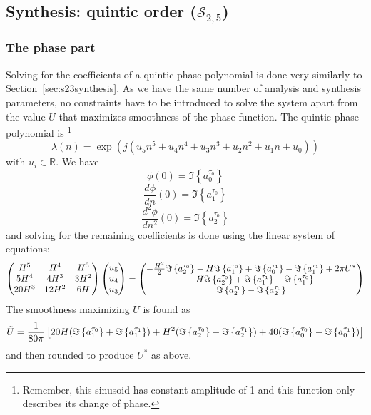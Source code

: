 \subsection{Synthesis: quintic order ($\mathscr{S}_{2,5}$) \label{s25synthesis}}

\subsubsection{The phase part}

Solving for the coefficients of a quintic phase polynomial is done very
similarly to Section~\ref{sec:s23synthesis}. As we have the same number of
analysis and synthesis parameters, no constraints have to be
introduced to solve the system apart from the value $U$ that maximizes
smoothness of the phase function. The quintic phase polynomial is%
\footnote{Remember, this sinusoid has constant amplitude of 1 and
this function only describes its change of phase.}
\begin{equation}
    \label{eq:quinticphasepoly}
    \lambda(n) = \exp \left(j\left(u_5 n^{5} + u_4 n^{4} + u_3 n^{3} + u_2 n^{2}
    + u_1 n + u_0 \right)\right)
\end{equation}
with $u_i \in \mathbb{R}$. We have
\[
    \phi(0) = \Im \left\{ a^{\tau_0}_0 \right\}
\]
\[
    \frac{d \phi}{d n}(0) = \Im \left\{ a^{\tau_0}_1 \right\}
\]
\[
    \frac{d^{2} \phi}{d n^{2}}(0) = \Im \left\{ a^{\tau_0}_2 \right\}
\]
and solving for the remaining coefficients is done using the linear system of
equations:
\[
    \begin{pmatrix}
        H^5 & H^4 & H^3 \\
        5 H^4 & 4 H^3 & 3 H^2 \\
        20 H^3 & 12 H^2 & 6 H
    \end{pmatrix}
    \begin{pmatrix}
        u_5 \\
        u_4 \\
        u_3
    \end{pmatrix}
    =
    \begin{pmatrix}
        -\frac{ H^{2} }{2} \Im \left\{  a^{\tau_0}_2  \right\} - H \Im \left\{  a^{\tau_0}_1  \right\} +
            \Im \left\{  a^{\tau_1}_0  \right\} - \Im \left\{  a^{\tau_1}_1  \right\} + 2 \pi U^{\ast}\\
        -H \Im \left\{  a^{\tau_0}_2  \right\} + \Im \left\{  a^{\tau_1}_1  \right\} - \Im \left\{  a^{\tau_0}_1  \right\} \\
        \Im \left\{  a^{\tau_1}_2  \right\} - \Im \left\{  a^{\tau_0}_2  \right\}
    \end{pmatrix}
\]
The smoothness maximizing $\tilde{U}$ is found as
\[
    \tilde{U} = \frac{1}{80 \pi} \left[ 20 H ( \Im \left\{  a^{\tau_0}_1  \right\} + \Im \left\{  a^{\tau_1}_1  \right\} )
        + H^2 ( \Im \left\{  a^{\tau_0}_2  \right\} - \Im \left\{  a^{\tau_1}_2  \right\} )
        + 40 ( \Im \left\{  a^{\tau_0}_0  \right\} - \Im \left\{  a^{\tau_1}_0  \right\} ) \right]
\]
and then rounded to produce $U^{\ast}$ as above.

